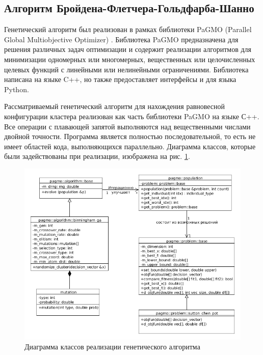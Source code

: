 \subsection{Алгоритм Бройдена-Флетчера-Гольдфарба-Шанно}
\label{sec:2e}

Генетический алгоритм был реализован в рамках библиотеки PaGMO
(Parallel Global Multiobjective Optimizer) \cite{pagmo}.
Библиотека PaGMO предназначена для решения различных задач оптимизации
и содержит реализации алгоритмов для минимизации одномерных или многомерных,
вещественных или целочисленных целевых функций с линейными или нелинейными
ограничениями. Библиотека написана на языке C++, но также предоставляет
интерфейсы и для языка Python.

Рассматриваемый генетический алгоритм для нахождения равновесной конфигурации
кластера реализован как часть библиотеки PaGMO на языке С++. Все операции с плавающей
запятой выполняются над вещественными числами двойной точности. Программа является
полностью последовательной, то есть не имеет областей кода, выполняющихся параллельно.
Диаграмма классов, которые были задействованы при реализации, изображена на рис. \ref{class_diagram}.

\begin{figure}[ht!]
\centering
  \includegraphics[width=1.0\textwidth]{./FIGs/pagmo_class_hierarchy.png}
  \caption{Диаграмма классов реализации генетического алгоритма}
\label{class_diagram}
\end{figure}

